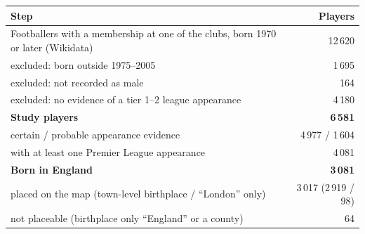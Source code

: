 \begin{tabular}{lr}
\toprule
Step & Players
\\
\midrule
Footballers with a membership at one of the clubs, born 1970 or later (Wikidata) & 12\,620 \\
\quad excluded: born outside 1975--2005 & 1\,695 \\
\quad excluded: not recorded as male & 164 \\
\quad excluded: no evidence of a tier 1--2 league appearance & 4\,180 \\
\textbf{Study players} & \textbf{6\,581} \\
\quad certain / probable appearance evidence & 4\,977 / 1\,604 \\
\quad with at least one Premier League appearance & 4\,081 \\
\textbf{Born in England} & \textbf{3\,081} \\
\quad placed on the map (town-level birthplace / ``London'' only) & 3\,017 (2\,919 / 98) \\
\quad not placeable (birthplace only ``England'' or a county) & 64 \\
\bottomrule
\end{tabular}
